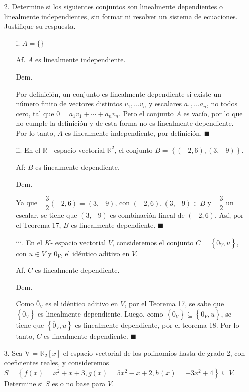 \documentclass[fleqn]{article}
\begin{document}
    \begin{enumerate}
        \item[2.] Determine si los siguientes conjuntos son linealmente dependientes o linealmente independientes, sin formar ni resolver un sistema de ecuaciones. Justifique su respuesta.
    
        \begin{enumerate}
            \item[i.] $ A = \{\} $
        
            Af. $ A $ es linealmente independiente.

            Dem.

            Por definición, un conjunto es linealmente dependiente si existe un número finito de vectores distintos $ v_1, \ldots v_n $ y escalares $ a_1, \ldots a_n $, no todos cero, tal que $ \overline{0} = a_1 v_1 + \cdots + a_n v_n $. Pero el conjunto $ A $ es vacío, por lo que no cumple la definición y de esta forma no es linealmente dependiente. Por lo tanto, $ A $ es linealmente independiente, por definición. $ \blacksquare $ 

            \item[ii.] En el $ \mathbb{R} $ - espacio vectorial $ \mathbb{R}^2 $, el conjunto $ B = \left \lbrace (-2,6), (3,-9) \right \rbrace $.
            
            Af: $ B $ es linealmente dependiente.

            Dem.

            Ya que $ - \dfrac{3}{2} (-2,6) = (3,-9) $, con $ (-2,6), (3,-9) \in B $ y $ - \dfrac{3}{2} $ un escalar, se tiene que $ (3,-9) $ es combinación lineal de $ (-2,6) $. Así, por el Teorema 17, $ B $ es linealmente dependiente. $ \blacksquare $

            \item[iii.] En  el $ K $- espacio vectorial $ V $, consideremos el conjunto $ C = \left \lbrace \overline{0}_V, u \right \rbrace $, con $ u \in V $ y $ \overline{0}_V $, el idéntico aditivo en $ V $.
            
            Af. $ C $ es linealmente dependiente.

            Dem.

            Como $ \overline{0}_V $ es el idéntico aditivo en $ V $, por el Teorema 17, se sabe que $ \left\lbrace \overline{0}_V \right\rbrace $ es linealmente dependiente. Luego, como $ \left\lbrace \overline{0}_V \right\rbrace \subseteq \left \lbrace \overline{0}_V, u \right \rbrace $, se tiene que $ \left \lbrace \overline{0}_V, u \right \rbrace $ es linealmente dependiente, por el teorema 18. Por lo tanto, $ C $ es linealmente dependiente. $ \blacksquare $
        \end{enumerate}
        \item[3.] Sea V = $ \mathbb{R}_2 [x] $ el espacio vectorial de los polinomios hasta de grado 2, con coeficientes reales, y consideremos $ S = \left\lbrace f(x) = x^2 + x + 3, g(x) = 5x^2 - x + 2, h(x) = -3x^2 + 4 \right\rbrace \subseteq V $.  Determine si $ S $ es o no base para $ V $.
        

\end{enumerate}
\end{document}
